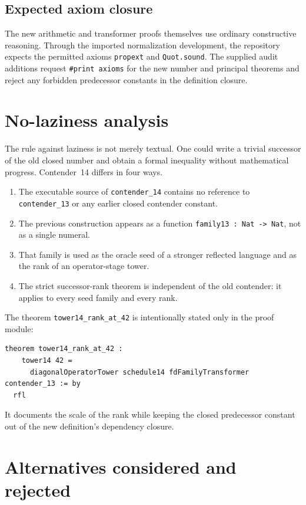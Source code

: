 \documentclass[11pt]{article}
\theoremstyle{definition}
\theoremstyle{remark}
\newcommand{\lean}[1]{\texttt{#1}}
\begin{document}
\subsection{Expected axiom closure}

The new arithmetic and transformer proofs themselves use ordinary constructive
reasoning.  Through the imported normalization development, the repository
expects the permitted axioms \lean{propext} and \lean{Quot.sound}.  The supplied
audit additions request \lean{\#print axioms} for the new number and principal
theorems and reject any forbidden predecessor constants in the definition
closure.

\section{No-laziness analysis}

The rule against laziness is not merely textual.  One could write a trivial
successor of the old closed number and obtain a formal inequality without
mathematical progress.  Contender~14 differs in four ways.

\begin{enumerate}[leftmargin=*]
\item The executable source of \lean{contender\_14} contains no reference to
  \lean{contender\_13} or any earlier closed contender constant.
\item The previous construction appears as a function
  \lean{family13 : Nat -> Nat}, not as a single numeral.
\item That family is used as the oracle seed of a stronger reflected language
  and as the rank of an operator-stage tower.
\item The strict successor-rank theorem is independent of the old contender:
  it applies to every seed family and every rank.
\end{enumerate}

The theorem \lean{tower14\_rank\_at\_42} is intentionally stated only in the
proof module:

\begin{lstlisting}
theorem tower14_rank_at_42 :
    tower14 42 =
      diagonalOperatorTower schedule14 fdFamilyTransformer contender_13 := by
  rfl
\end{lstlisting}

It documents the scale of the rank while keeping the closed predecessor
constant out of the new definition's dependency closure.

\section{Alternatives considered and rejected}
\end{document}
